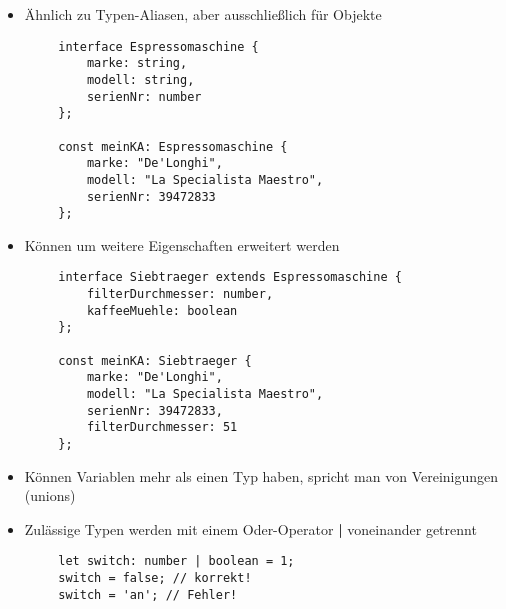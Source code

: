 \documentclass[10pt]{article}
\begin{document}
    \begin{tcolorbox}[
    colback=Green!5!white,
    colframe=Green!75!black,
    title={\centering Interfaces}]
    \begin{itemize}
        \item Ähnlich zu Typen-Aliasen, aber ausschließlich für Objekte
    \end{itemize}
    \begin{lstlisting}
        interface Espressomaschine {
            marke: string,
            modell: string,
            serienNr: number
        };

        const meinKA: Espressomaschine {
            marke: "De'Longhi",
            modell: "La Specialista Maestro",
            serienNr: 39472833
        };
    \end{lstlisting}
    \begin{itemize}
        \item Können um weitere Eigenschaften erweitert werden
    \end{itemize}
    \begin{lstlisting}
        interface Siebtraeger extends Espressomaschine {
            filterDurchmesser: number,
            kaffeeMuehle: boolean
        };

        const meinKA: Siebtraeger {
            marke: "De'Longhi",
            modell: "La Specialista Maestro",
            serienNr: 39472833,
            filterDurchmesser: 51
        };
    \end{lstlisting}
    \end{tcolorbox}

    \begin{tcolorbox}[
    colback=Yellow!5!white,
    colframe=Yellow!75!black,
    title={\centering Vereinigungen}]
    \begin{itemize}
        \item Können Variablen mehr als einen Typ haben, spricht man von Vereinigungen (unions)
        \item Zulässige Typen werden mit einem Oder-Operator \textbf{|} voneinander getrennt
    \end{itemize}
    \begin{lstlisting}
        let switch: number | boolean = 1;
        switch = false; // korrekt!
        switch = 'an'; // Fehler!
    \end{lstlisting}
    \end{tcolorbox}
\end{document}
